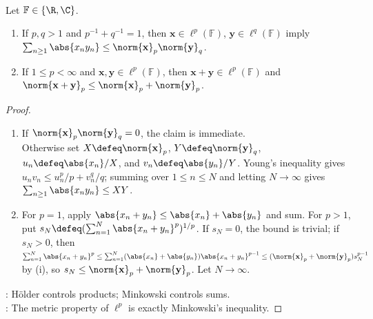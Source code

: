 \begin{theorem} \label{thm:holder-minkowski-sequence-spaces} \\
Let $\mathbb{F}\in\{\R,\C\}$.
\begin{enumerate}[label=(\roman*)]
\setlength{\itemsep}{0pt}
\item If $p,q>1$ and $p^{-1}+q^{-1}=1$, then $\mathbf{x}\in\ell^p(\mathbb{F})$, $\mathbf{y}\in\ell^q(\mathbb{F})$ imply $\sum_{n\geq1}\abs{x_ny_n}\leq\norm{\mathbf{x}}_p\norm{\mathbf{y}}_q$.
\item If $1\leq p<\infty$ and $\mathbf{x},\mathbf{y}\in\ell^p(\mathbb{F})$, then $\mathbf{x}+\mathbf{y}\in\ell^p(\mathbb{F})$ and $\norm{\mathbf{x}+\mathbf{y}}_p\leq\norm{\mathbf{x}}_p+\norm{\mathbf{y}}_p$.
\end{enumerate}
\begin{proof}
\begin{enumerate}[label=(\roman*)]
\setlength{\itemsep}{0pt}
\item If $\norm{\mathbf{x}}_p\norm{\mathbf{y}}_q=0$, the claim is immediate.\\
Otherwise set $X\defeq\norm{\mathbf{x}}_p$, $Y\defeq\norm{\mathbf{y}}_q$, $u_n\defeq\abs{x_n}/X$, and $v_n\defeq\abs{y_n}/Y$. Young's inequality gives $u_nv_n\leq u_n^p/p+v_n^q/q$; summing over $1\leq n\leq N$ and letting $N\to\infty$ gives $\sum_{n\geq1}\abs{x_ny_n}\leq XY$.
\item For $p=1$, apply $\abs{x_n+y_n}\leq\abs{x_n}+\abs{y_n}$ and sum. For $p>1$, put $s_N\defeq(\sum_{n=1}^{N}\abs{x_n+y_n}^p)^{1/p}$. If $s_N=0$, the bound is trivial; if $s_N>0$, then $\sum_{n=1}^{N}\abs{x_n+y_n}^{p}\leq\sum_{n=1}^{N}(\abs{x_n}+\abs{y_n})\abs{x_n+y_n}^{p-1}\leq(\norm{\mathbf{x}}_p+\norm{\mathbf{y}}_p)s_N^{p-1}$ by (i), so $s_N\leq\norm{\mathbf{x}}_p+\norm{\mathbf{y}}_p$. Let $N\to\infty$.
\end{enumerate}
: H\"older controls products; Minkowski controls sums.\\
: The metric property of $\ell^p$ is exactly Minkowski's inequality.
\end{proof}
\end{theorem}

